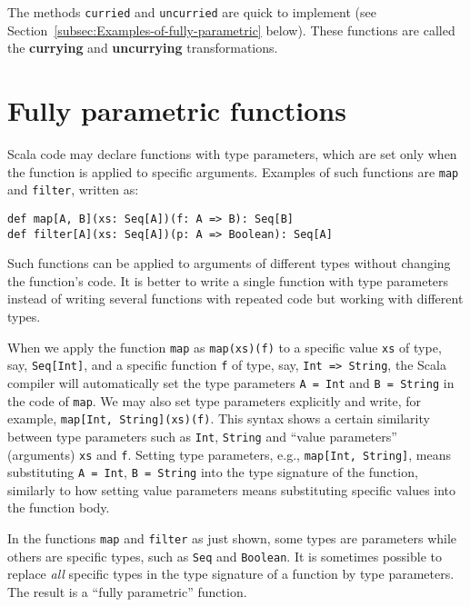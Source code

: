 The methods \lstinline!curried! and \lstinline!uncurried! are quick
to implement (see Section~\ref{subsec:Examples-of-fully-parametric}
below). These functions are called the \textbf{currying}
and \textbf{uncurrying} transformations.

\section{Fully parametric functions\label{sec:Fully-parametric-functions}}

Scala code may declare functions with type parameters, which are set
only when the function is applied to specific arguments. Examples
of such functions are \lstinline!map! and \lstinline!filter!, written
as:
\begin{lstlisting}
def map[A, B](xs: Seq[A])(f: A => B): Seq[B]
def filter[A](xs: Seq[A])(p: A => Boolean): Seq[A]
\end{lstlisting}
Such functions can be applied to arguments of different types without
changing the function\textsf{'}s code. It is better to write a single function
with type parameters instead of writing several functions with repeated
code but working with different types.

When we apply the function \lstinline!map! as \lstinline!map(xs)(f)!
to a specific value \lstinline!xs! of type, say, \lstinline!Seq[Int]!,
and a specific function \lstinline!f! of type, say, \lstinline!Int => String!,
the Scala compiler will automatically set the type parameters \lstinline!A = Int!
and \lstinline!B = String! in the code of \lstinline!map!. We may
also set type parameters explicitly and write, for example, \lstinline!map[Int, String](xs)(f)!.
This syntax shows a certain similarity between type parameters such
as \lstinline!Int!, \lstinline!String! and \textsf{``}value parameters\textsf{''}
(arguments) \lstinline!xs! and \lstinline!f!. Setting type parameters,
e.g., \lstinline!map[Int, String]!, means substituting \lstinline!A = Int!,
\lstinline!B = String! into the type signature of the function, similarly
to how setting value parameters means substituting specific values
into the function body.

In the functions \lstinline!map! and \lstinline!filter! as just
shown, some types are parameters while others are specific types,
such as \lstinline!Seq! and \lstinline!Boolean!. It is sometimes
possible to replace \emph{all} specific types in the type signature
of a function by type parameters. The result is a \textsf{``}fully parametric\textsf{''}
function.

